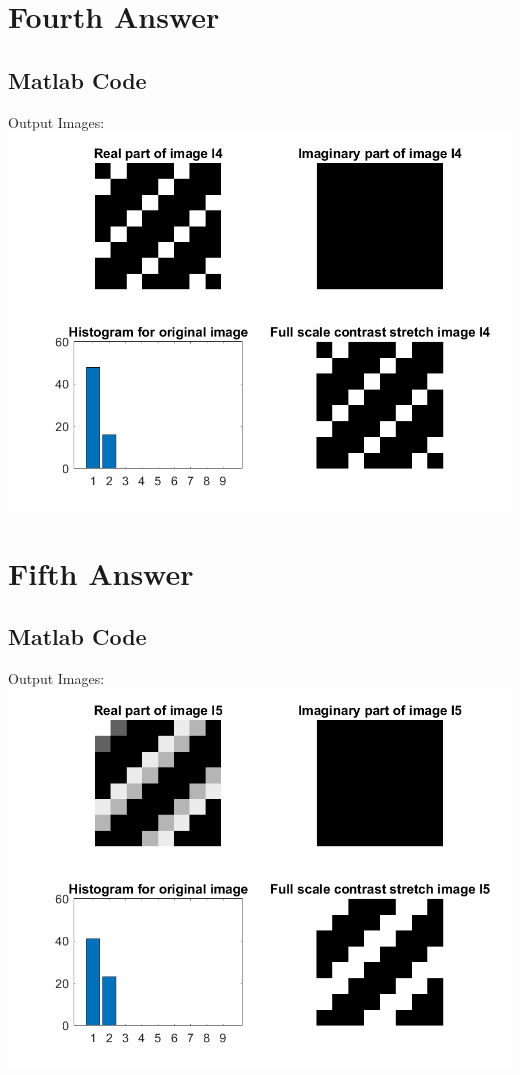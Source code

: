 \documentclass[11pt]{article} %
\begin{document}
\section {Fourth Answer}
\subsection*{Matlab Code}

Output Images:
\includegraphics{Q4.png}


\section {Fifth Answer}
\subsection*{Matlab Code}

Output Images:
\includegraphics{Q5.png}
\end{document}
